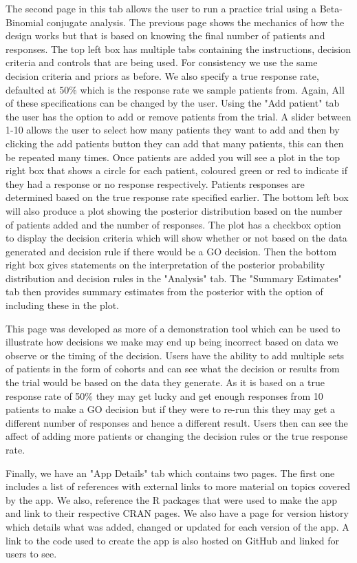 The second page in this tab allows the user to run a practice trial using a Beta-Binomial conjugate analysis. The previous page shows the mechanics of how the design works but that is based on knowing the final number of patients and responses.  The top left box has multiple tabs containing the instructions, decision criteria and controls that are being used. For consistency we use the same decision criteria and priors as before. We also specify a true response rate, defaulted at 50\% which is the response rate we sample patients from. Again, All of these specifications can be changed by the user. Using the "Add patient" tab the user has the option to add or remove patients from the trial. A slider between 1-10 allows the user to select how many patients they want to add and then by clicking the add patients button they can add that many patients, this can then be repeated many times. Once patients are added you will see a plot in the top right box that shows a circle for each patient, coloured green or red to indicate if they had a response or no response respectively. Patients responses are determined based on the true response rate specified earlier. The bottom left box will also produce a plot showing the posterior distribution based on the number of patients added and the number of responses. The plot has a checkbox option to display the decision criteria which will show whether or not based on the data generated and decision rule if there would be a GO decision. Then the bottom right box gives statements on the interpretation of the posterior probability distribution and decision rules in the "Analysis" tab. The "Summary Estimates" tab then provides summary estimates from the posterior with the option of including these in the plot. 

This page was developed as more of a demonstration tool which can be used to illustrate how decisions we make may end up being incorrect based on data we observe or the timing of the decision. Users have the ability to add multiple sets of patients in the form of cohorts and can see what the decision or results from the trial would be based on the data they generate. As it is based on a true response rate of 50\% they may get lucky and get enough responses from 10 patients to make a GO decision but if they were to re-run this they may get a different number of responses and hence a different result. Users then can see the affect of adding more patients or changing the decision rules or the true response rate. 

Finally, we have an "App Details" tab which contains two pages. The first one includes a list of references with external links to more material on topics covered by the app. We also, reference the R packages that were used to make the app and link to their respective CRAN pages. We also have a page for version history which details what was added, changed or updated for each version of the app. A link to the code used to create the app is also hosted on GitHub and linked for users to see.  

